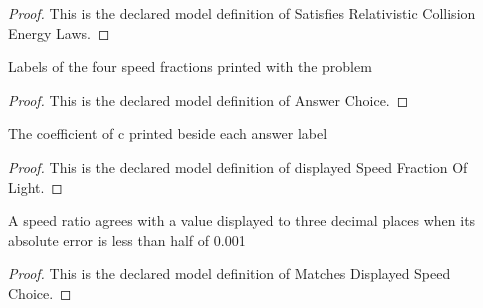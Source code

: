 \begin{proof}
  This is the declared model definition of Satisfies Relativistic Collision Energy Laws.
\end{proof}
\begin{definition}
  \label{def:physics:phyx-mini-0511:phyxminiproblems-problemphyxmini0511-answerchoice}
  Labels of the four speed fractions printed with the problem
\end{definition}
\begin{proof}
  This is the declared model definition of Answer Choice.
\end{proof}
\begin{definition}
  \label{def:physics:phyx-mini-0511:phyxminiproblems-problemphyxmini0511-displayedspeedfractionoflight}
  The coefficient of c printed beside each answer label
\end{definition}
\begin{proof}
  This is the declared model definition of displayed Speed Fraction Of Light.
\end{proof}
\begin{definition}
  \label{def:physics:phyx-mini-0511:phyxminiproblems-problemphyxmini0511-matchesdisplayedspeedchoice}
  A speed ratio agrees with a value displayed to three decimal places when its absolute error is less than half of 0.001
\end{definition}
\begin{proof}
  This is the declared model definition of Matches Displayed Speed Choice.
\end{proof}
